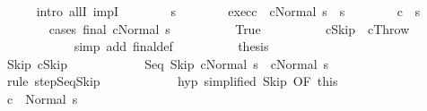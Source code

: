 \begin{isabellebody}
\ \ \ \ \isamarkupfalse%
\ {\isacharparenleft}intro\ allI\ impI{\isacharparenright}\isanewline
\ \ \ \ \ \ \isamarkupfalse%
\ s{\isacharprime}\isanewline
\ \ \ \ \ \ \isamarkupfalse%
\ exec{\isacharunderscore}c\ {\isachardoublequoteopen}{\isasymGamma}{\isasymturnstile}\ {\isasymlangle}cNormal\ s{\isasymrangle}\ {\isasymRightarrow}\ s{\isacharprime}{\isachardoublequoteclose}\isanewline
\ \ \ \ \ \ \isamarkupfalse%
\ {\isachardoublequoteopen}{\isasymGamma}{\isasymturnstile}c\ {\isasymdown}\ s{\isacharprime}{\isachardoublequoteclose}\isanewline
\ \ \ \ \ \ \isamarkupfalse%
\ {\isacharparenleft}cases\ {\isachardoublequoteopen}final\ {\isacharparenleft}cNormal\ s{\isacharparenright}{\isachardoublequoteclose}{\isacharparenright}\isanewline
\ \ \ \ \ \ \ \ \isamarkupfalse%
\ True\isanewline
\ \ \ \ \ \ \ \ \isamarkupfalse%
\ {\isachardoublequoteopen}cSkip\ {\isasymor}\ cThrow{\isachardoublequoteclose}\isanewline
\ \ \ \ \ \ \ \ \ \ \isamarkupfalse%
\ {\isacharparenleft}simp\ add{\isacharcolon}\ final{\isacharunderscore}def{\isacharparenright}\isanewline
\ \ \ \ \ \ \ \ \isamarkupfalse%
\ {\isacharquery}thesis\isanewline
\ \ \ \ \ \ \ \ \isamarkupfalse%
\isanewline
\ \ \ \ \ \ \ \ \ \ \isamarkupfalse%
\ Skip{\isacharcolon}\ {\isachardoublequoteopen}cSkip{\isachardoublequoteclose}\isanewline
\ \ \ \ \ \ \ \ \ \ \isamarkupfalse%
\ {\isachardoublequoteopen}{\isasymGamma}{\isasymturnstile}{\isacharparenleft}Seq\ Skip\ cNormal\ s{\isacharparenright}\ {\isasymrightarrow}\ {\isacharparenleft}cNormal\ s{\isacharparenright}{\isachardoublequoteclose}\isanewline
\ \ \ \ \ \ \ \ \ \ \ \ \isamarkupfalse%
\ {\isacharparenleft}rule\ step{\isachardot}SeqSkip{\isacharparenright}\isanewline
\ \ \ \ \ \ \ \ \ \ \isamarkupfalse%
\ hyp\ {\isacharbrackleft}simplified\ Skip{\isacharcomma}\ OF\ this{\isacharbrackright}\isanewline
\ \ \ \ \ \ \ \ \ \ \isamarkupfalse%
\ {\isachardoublequoteopen}{\isasymGamma}{\isasymturnstile}c\ {\isasymdown}\ Normal\ s{\isachardoublequoteclose}\ \isacommand{{\isachardot}}\isamarkupfalse%

\end{isabellebody}
